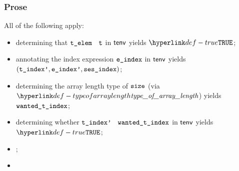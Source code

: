 \subsubsection{Prose}
All of the following apply:
\begin{itemize}
  \item determining that $\texttt{t\_elem}$ \typesatisfies\ $\texttt{t}$ in $\textsf{tenv}$ yields $\True$\ProseOrTypeError;
  \item annotating the index expression $\texttt{e\_index}$ in $\textsf{tenv}$ yields \\
        $(\texttt{t\_index'}, \texttt{e\_index'}, \texttt{ses\_index})$\ProseOrTypeError;
  \item determining the array length type of $\texttt{size}$ (via $\typeofarraylength$) yields \\
        $\texttt{wanted\_t\_index}$;
  \item determining whether $\texttt{t\_index'}$ \typesatisfies\ $\texttt{wanted\_t\_index}$ in $\textsf{tenv}$ yields \\
        $\True$\ProseOrTypeError;
  \item {};
  \item {}
\end{itemize}

